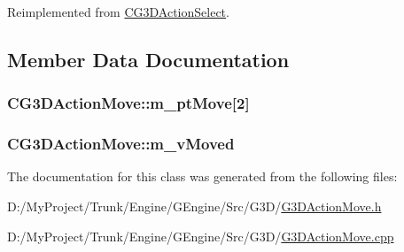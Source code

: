 Reimplemented from \hyperlink{class_c_g3_d_action_select_a45e05f0516abe52906246744a548f003}{C\+G3\+D\+Action\+Select}.



\subsection{Member Data Documentation}
\hypertarget{class_c_g3_d_action_move_a7b4b01175e91ee12c2dc6714372acdbf}{}
\subsubsection[{m\+\_\+pt\+Move}]{ C\+G3\+D\+Action\+Move\+::m\+\_\+pt\+Move\mbox{[}2\mbox{]}\hspace{0.3cm}{\ttfamily [protected]}}\label{class_c_g3_d_action_move_a7b4b01175e91ee12c2dc6714372acdbf}
\hypertarget{class_c_g3_d_action_move_a601d0a4ab20bc6722313042f9bd26610}{}
\subsubsection[{m\+\_\+v\+Moved}]{ C\+G3\+D\+Action\+Move\+::m\+\_\+v\+Moved\hspace{0.3cm}{\ttfamily [protected]}}\label{class_c_g3_d_action_move_a601d0a4ab20bc6722313042f9bd26610}


The documentation for this class was generated from the following files\+:\begin{DoxyCompactItemize}
\item 
D\+:/\+My\+Project/\+Trunk/\+Engine/\+G\+Engine/\+Src/\+G3\+D/\hyperlink{_g3_d_action_move_8h}{G3\+D\+Action\+Move.\+h}\item 
D\+:/\+My\+Project/\+Trunk/\+Engine/\+G\+Engine/\+Src/\+G3\+D/\hyperlink{_g3_d_action_move_8cpp}{G3\+D\+Action\+Move.\+cpp}\end{DoxyCompactItemize}
